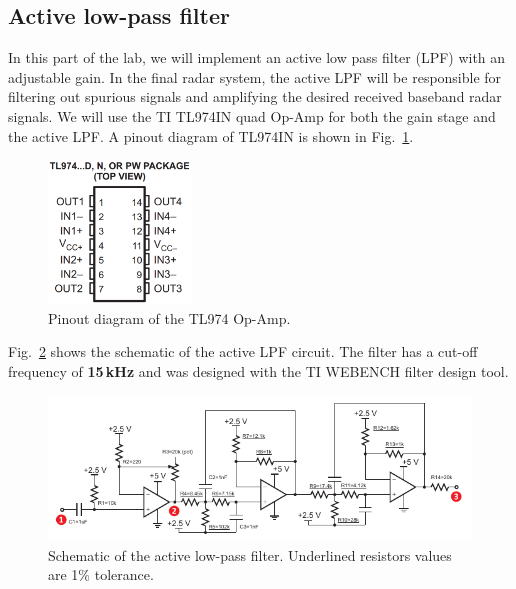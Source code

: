 \documentclass[letterpaper, 11pt]{article}
\begin{document}
\subsection{Active low-pass filter}
\label{sec:lpf}

In this part of the lab, we will implement an active low pass filter (LPF) with an adjustable gain. In the final radar system, the active LPF will be responsible for filtering out spurious signals and amplifying the desired received baseband radar signals. We will use the TI TL974IN quad Op-Amp for both the gain stage and the active LPF. A pinout diagram of TL974IN is shown in Fig.~\ref{fig:tl974-pinout}. 

\begin{figure}[h]
	\centering
	\includegraphics[width=1.5in]{tl974-pinout}
	\caption{Pinout diagram of the TL974 Op-Amp.}
	\label{fig:tl974-pinout}
\end{figure}

Fig.~\ref{fig:lpf-sch} shows the schematic of the active LPF circuit. The filter has a cut-off frequency of \textbf{15\,kHz} and was designed with the TI WEBENCH filter design tool.  





\begin{figure}[h]
	\centering
	\includegraphics[width=5.3in]{lpf-sch}
	\caption{Schematic of the active low-pass filter. Underlined resistors values are 1\% tolerance.}
	\label{fig:lpf-sch}
\end{figure}
\end{document}
